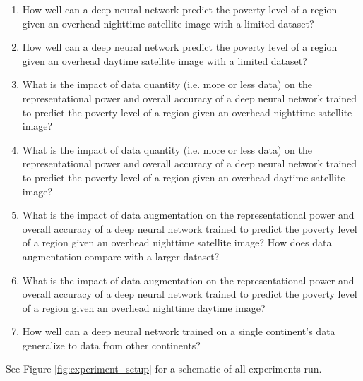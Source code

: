 \documentclass{article}
\begin{document}
\begin{enumerate}[label=(\alph*)]
    \item How well can a deep neural network predict the poverty level of a region given an overhead nighttime satellite image with a limited dataset?
    \item How well can a deep neural network predict the poverty level of a region given an overhead daytime satellite image with a limited dataset?
    \item What is the impact of data quantity (i.e. more or less data) on the representational power and overall accuracy of a deep neural network trained to predict the poverty level of a region given an overhead nighttime satellite image?
    \item What is the impact of data quantity (i.e. more or less data) on the representational power and overall accuracy of a deep neural network trained to predict the poverty level of a region given an overhead daytime satellite image?
    \item What is the impact of data augmentation on the representational power and overall accuracy of a deep neural network trained to predict the poverty level of a region given an overhead nighttime satellite image? How does data augmentation compare with a larger dataset?
    \item What is the impact of data augmentation on the representational power and overall accuracy of a deep neural network trained to predict the poverty level of a region given an overhead nighttime daytime image?
    \item How well can a deep neural network trained on a single continent’s data generalize to data from other continents?
\end{enumerate}

See Figure \ref{fig:experiment_setup} for a schematic of all experiments run.
\end{document}
